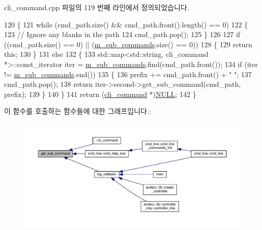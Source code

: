 cli\+\_\+command.\+cpp 파일의 119 번째 라인에서 정의되었습니다.


\begin{DoxyCode}
120 \{
121     \textcolor{keywordflow}{while} (cmd\_path.size() && cmd\_path.front().length() == 0)
122     \{
123         \textcolor{comment}{// Ignore any blanks in the path}
124         cmd\_path.pop();
125     \}
126 
127     \textcolor{keywordflow}{if} ((cmd\_path.size() == 0) || (\hyperlink{classcli__command_a5a62acea342a09bb5de738b81f3243b5}{m\_sub\_commands}.size() == 0))
128     \{
129         \textcolor{keywordflow}{return} \textcolor{keyword}{this};
130     \}
131     \textcolor{keywordflow}{else}
132     \{
133         std::map<std::string, cli\_command *>::const\_iterator iter = 
      \hyperlink{classcli__command_a5a62acea342a09bb5de738b81f3243b5}{m\_sub\_commands}.find(cmd\_path.front());
134         \textcolor{keywordflow}{if} (iter != \hyperlink{classcli__command_a5a62acea342a09bb5de738b81f3243b5}{m\_sub\_commands}.end())
135         \{
136             prefix += cmd\_path.front() + \textcolor{stringliteral}{" "};
137             cmd\_path.pop();
138             \textcolor{keywordflow}{return} iter->second->get\_sub\_command(cmd\_path, prefix);
139         \}
140     \}
141     \textcolor{keywordflow}{return} (\hyperlink{classcli__command}{cli\_command} *)\hyperlink{openavb__types__base__pub_8h_a070d2ce7b6bb7e5c05602aa8c308d0c4}{NULL};
142 \}
\end{DoxyCode}


이 함수를 호출하는 함수들에 대한 그래프입니다.\+:
\nopagebreak
\begin{figure}[H]
\begin{center}
\leavevmode
\includegraphics[width=350pt]{classcli__command_a5042df63d377c418f2dec9c935122441_icgraph}
\end{center}
\end{figure}


